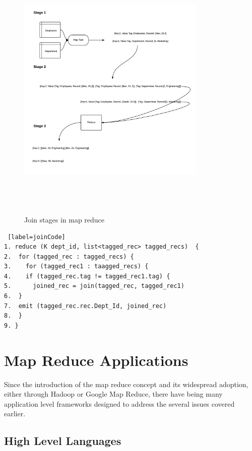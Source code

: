 \documentclass[10pt,twocolumn]{IEEEtran11}
\begin{document}
\begin{figure}[h]
	\centering
	\includegraphics[height = 13cm,width=9cm]{images/mapReduceJoin.png}
	\caption{Join stages in map reduce}
	\label{fig:mrJoin}
\end{figure}

\begin{lstlisting} [label=joinCode]
1. reduce (K dept_id, list<tagged_rec> tagged_recs)  {
2.  for (tagged_rec : tagged_recs) {
3.    for (tagged_rec1 : taagged_recs) {
4.	  if (tagged_rec.tag != tagged_rec1.tag) {
5.	    joined_rec = join(tagged_rec, tagged_rec1)
6.  }
7.  emit (tagged_rec.rec.Dept_Id, joined_rec)
8.  }
9. }
\end{lstlisting}


\section{Map Reduce Applications}

Since the introduction of the map reduce concept and its widespread adoption, either through Hadoop or Google Map Reduce, there have being many application level frameworks designed to address the several issues covered earlier.

\subsection{High Level Languages}
\end{document}

